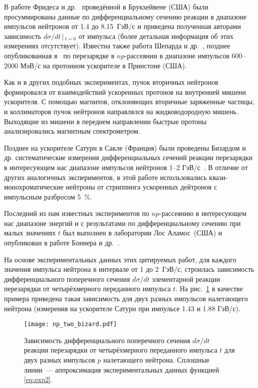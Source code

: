 В работе Фридеса и др.~\cite{friedes65} проведённой в Брукхейвене (США) были
просуммированы данные по дифференциальному сечению реакции \np в диапазоне
импульсов нейтронов от 1.4 до 8.15~ГэВ/с и приведена полученная авторами
зависимость $d\sigma/dt\,|\,_{t=0}$ от импульса (более детальная информация об
этих измерениях отсутствует). Известна также работа Шепарда и др.~\cite{shep69},
позднее опубликованная в~\cite{shep74} по перезарядке в $np$-рассеянии в
диапазоне импульсов 600--2000 МэВ/с на протонном ускорителе в Принстоне (США).

Как и в других подобных экспериментах, пучок вторичных нейтронов формировался от
взаимодействий ускоренных протонов на внутренней мишени ускорителя. С помощью
магнитов, отклоняющих вторичные заряженные частицы, и коллиматоров пучок
нейтронов направлялся на жидководородную мишень. Выходящие из мишени в переднем
направлении быстрые протоны анализировались магнитным спектрометром.

Позднее на ускорителе Сатурн в Сакле (Франция) были проведены Бизардом и
др. систематические измерения дифференциальных сечений реакции перезарядки \np в
интересующем нас диапазоне импульсов нейтронов 1--2 ГэВ/с~\cite{biz75}. В
отличие от других аналогичных экспериментов, в этой работе использовались
квази-монохроматические нейтроны от стриппинга ускоренных дейтронов с импульсным
разбросом 5~$\%$.

Последний из нам известных экспериментов по $np$-рассеянию в интересующем нас
диапазоне энергий и с результатами по дифференциальному сечению при малых
значениях $t$ был выполнен в лаборатории Лос Аламос~(США) и опубликован в работе
Боннера и др.~\cite{bon78}.

На основе экспериментальных данных этих цитируемых работ, для каждого значения
импульса нейтрона в интервале от 1 до 2~ГэВ/с, строилась зависимость
дифференциального поперечного сечения $d\sigma/dt$ элементарной реакции
перезарядки \np от четырёхмерного переданного импульса $t$. На
рис.~\ref{fig:np_two_bizard} в качестве примера приведена такая зависимость для
двух разных импульсов налетающего нейтрона (измерения на ускорителе Сатурн при
импульсе 1.43 и 1.88 ГэВ/с).

\begin{figure}[h]
  \centering
  \texttt{[image: np\_two\_bizard.pdf]}
  \caption{Зависимость дифференциального поперечного сечения $d\sigma/dt$
    реакции перезарядки \np от четырёхмерного переданного импульса $t$ для двух
    разных импульсов $p$ налетающего нейтрона. Сплошные линии~--- аппроксимация
    экспериментальных данных функцией \eqref{eq:exp2}.}
  \label{fig:np_two_bizard}
\end{figure}

